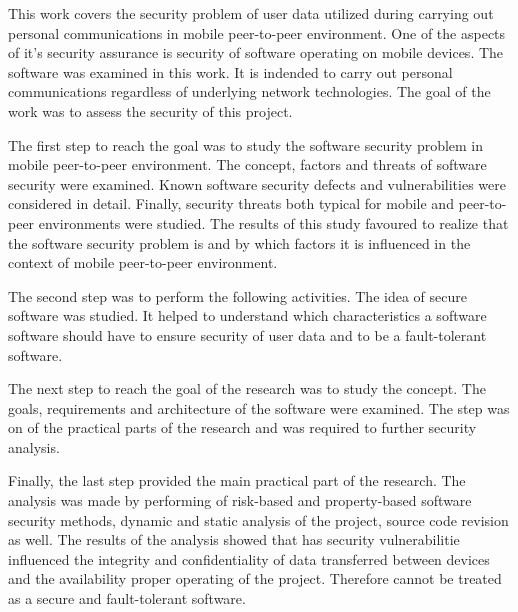 %
%
This work covers the security problem of user data utilized during carrying out personal communications in mobile peer-to-peer environment. 
%
One of the aspects of it's security assurance is security of software operating on mobile devices. 
%
The  software was examined in this work. 
%
It is indended to carry out personal communications regardless of underlying network technologies. 
%
The goal of the work was to assess the security of this project. 

%
The first step to reach the goal was to study the software security problem in mobile peer-to-peer environment. 
%
The concept, factors and threats of software security were examined. 
%
Known software security defects and vulnerabilities were considered in detail. 
%
Finally, security threats both typical for mobile and peer-to-peer environments were studied. 
%
The results of this study favoured to realize that the software security problem is and by which factors it is influenced in the context of mobile peer-to-peer environment. 

%
The second step was to perform the following activities. 
%
The idea of secure software was studied. 
%
It helped to understand which characteristics a software software should have to ensure security of user data and to be a fault-tolerant software. 

%
The next step to reach the goal of the research was to study the  concept. 
%
The goals, requirements and architecture of the software were examined. 
%
The step was on of the practical parts of the research and was required to further  security analysis. 

%
Finally, the last step provided the main practical part of the research. 
%
The  analysis was made by performing of risk-based and property-based software security methods, dynamic and static analysis of the project, source code revision as well. 
%
The results of the analysis showed that  has security vulnerabilitie influenced the integrity and confidentiality of data transferred between devices and the availability proper operating of the project. 
%
Therefore  cannot be treated as a secure and fault-tolerant software. 

